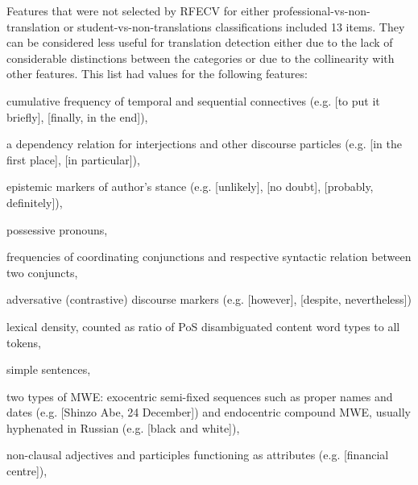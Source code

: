 Features that were not selected by RFECV for either professional-vs-non-translation or student-vs-non-translations classifications included 13 items. They can be considered less useful for translation detection either due to the lack of considerable distinctions between the categories or due to the collinearity with other features. This list had values for the following features:
\begin{description}\compresslist{}\label{pg:rfe_useless}
	\item[tempseq:] cumulative frequency of temporal and sequential connectives (e.g.  [to put it briefly],  [finally, in the end]),
	\item[discourse:] a dependency relation for interjections and other discourse particles (e.g.  [in the first place],  [in particular]),
	\item[epist:] epistemic markers of author's stance (e.g.  [unlikely],  [no doubt],  [probably, definitely]),
	\item[possp:] possessive pronouns,
	\item[cconj, conj:] frequencies of coordinating conjunctions and respective syntactic relation between two conjuncts, 
	\item[advers:] adversative (contrastive) discourse markers (e.g.  [however],  [despite, nevertheless])
	\item lexical density, counted as ratio of PoS disambiguated content word types to all tokens,
	\item simple sentences,
	\item[flat, compound:] two types of \gls{MWE}: exocentric semi-fixed sequences such as proper names and dates (e.g.  [Shinzo Abe, 24 December]) and endocentric compound MWE, usually hyphenated in Russian (e.g.  [black and white]),
	\item[amod:] non-clausal adjectives and participles functioning as attributes (e.g.  [financial centre]), %

\end{description}
